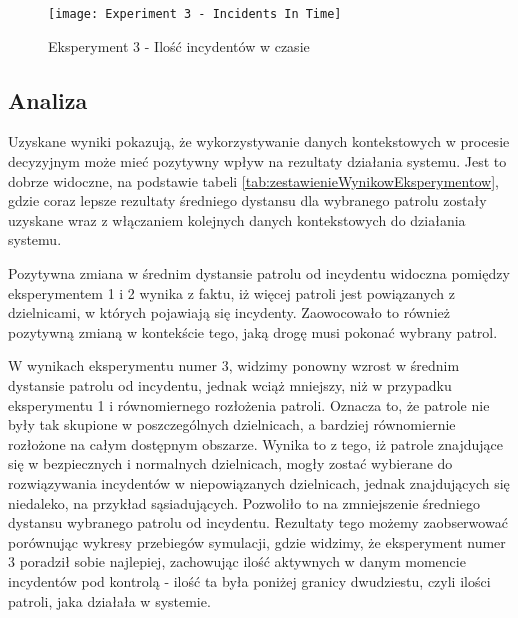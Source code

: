 \begin{figure}[H]
    \centering
    \texttt{[image: Experiment 3 - Incidents In Time]}
    \caption{Eksperyment 3 - Ilość incydentów w czasie}
    \label{fig:eksperyment3IloscIncydentowWCzasie}
\end{figure}

\subsection{Analiza}

\par Uzyskane wyniki pokazują, że wykorzystywanie danych kontekstowych w procesie decyzyjnym może mieć pozytywny wpływ na rezultaty działania systemu. Jest to dobrze widoczne, na podstawie tabeli \ref{tab:zestawienieWynikowEksperymentow}, gdzie coraz lepsze rezultaty średniego dystansu dla wybranego patrolu zostały uzyskane wraz z włączaniem kolejnych danych kontekstowych do działania systemu.

\par Pozytywna zmiana w średnim dystansie patrolu od incydentu widoczna pomiędzy eksperymentem 1 i 2 wynika z faktu, iż więcej patroli jest powiązanych z dzielnicami, w których pojawiają się incydenty. Zaowocowało to również pozytywną zmianą w kontekście tego, jaką drogę musi pokonać wybrany patrol.

\par W wynikach eksperymentu numer 3, widzimy ponowny wzrost w średnim dystansie patrolu od incydentu, jednak wciąż mniejszy, niż w przypadku eksperymentu 1 i równomiernego rozłożenia patroli. Oznacza to, że patrole nie były tak skupione w poszczególnych dzielnicach, a bardziej równomiernie rozłożone na całym dostępnym obszarze. Wynika to z tego, iż patrole znajdujące się w bezpiecznych i normalnych dzielnicach, mogły zostać wybierane do rozwiązywania incydentów w niepowiązanych dzielnicach, jednak znajdujących się niedaleko, na przykład sąsiadujących. Pozwoliło to na zmniejszenie średniego dystansu wybranego patrolu od incydentu. Rezultaty tego możemy zaobserwować porównując wykresy przebiegów symulacji, gdzie widzimy, że eksperyment numer 3 poradził sobie najlepiej, zachowując ilość aktywnych w danym momencie incydentów pod kontrolą - ilość ta była poniżej granicy dwudziestu, czyli ilości patroli, jaka działała w systemie.

